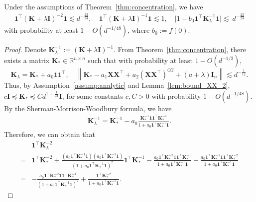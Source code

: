 \documentclass[twoside,11pt]{article}
\newcommand{\norm}[1]{\left\|#1\right\|}
\newcommand{\R}{\mathbb{R}}
\def\bI{{\mathbf I}}
\newcommand{\ones}{\mathbf{1}}
\def\bK{{\boldsymbol K}}
\def\bX{{\boldsymbol X}}
\renewcommand{\bK}{\boldsymbol{K}}
\newcommand{\1}{\mathbf{1}}
\def\tran{^\top}
\begin{document}
\begin{lemma}\label{lemm:oneK2one}
Under the assumptions of Theorem~\ref{thm:concentration}, we have
\begin{align}
    \ones^\top(\bK+\lambda\bI)^{-2}\ones\lesssim  d^{-\frac{23}{24}},  \quad 
     \1^\top(\bK+\lambda\bI)^{-1}\ones  \lesssim  1 , \quad 
          \big|1-  b_0\1^\top\bK_{\lambda}^{-1} \1\big|\lesssim ~ d^{-\frac{23}{24}}
\end{align}
 with probability at least $1-O(d^{-1/48})$, where $b_0:=f(0)$.
\end{lemma}
\begin{proof}
Denote $\bK_{\lambda}^{-1}:=(\bK+\lambda\bI)^{-1}$. From Theorem~\ref{thm:concentration}, there exists a matrix $\bK_*\in\R^{n\times n}$ such that with probability at least $1-O(d^{-1/2})$,
\[\bK_\lambda=\bK_*+a_0\1\1^\top, \quad \norm{\bK_*-a_1 \bX\bX\tran + a_2 (\bX\bX\tran)^{\odot 2} + (a+\lambda)\bI_n}\lesssim d^{-\frac{1}{12}}.\]
Thus, by Assumption~\ref{assump:analytic} and Lemma~\ref{lem:bound_XX_2},  $c\bI \preccurlyeq \bK_*\preccurlyeq Cd^{1+\frac{1}{24}}\bI$, for some constants $c,C>0$ with probability  $1-O(d^{-1/48})$. By the Sherman-Morrison-Woodbury formula, we have 
\begin{align}\label{eq:sm_formula}
    \bK_{\lambda}^{-1} = \bK_*^{-1}-a_0\frac{\bK_*^{-1}\1\1^\top\bK_*^{-1}}{1+a_0\1^\top\bK_*^{-1}\1}.
\end{align}
Therefore, we can obtain that
\begin{align}
    &\1^\top\bK_{\lambda}^{-2}  \\   =&\1^\top\bK_*^{-2}+\frac{(a_0\1^\top\bK_*^{-1}\1)(a_0\1^\top\bK_*^{-2}\1)}{(1+a_0\1^\top\bK_*^{-1}\1)^2}\1^\top\bK_*^{-1}-\frac{a_0\1^\top\bK_*^{-2}\1\1^\top\bK_*^{-1}}{1+a_0\1^\top\bK_*^{-1}\1}-\frac{a_0\1^\top\bK_*^{-1}\1\1^\top\bK_*^{-2}}{1+a_0\1^\top\bK_*^{-1}\1}\\
    =&-\frac{a_0\1^\top\bK_*^{-2}\1\1^\top\bK_*^{-1}}{(1+a_0\1^\top\bK_*^{-1}\1)^2}+\frac{\1^\top\bK_*^{-2}}{1+a_0\1^\top\bK_*^{-1}\1}.
\end{align}


\end{proof}
\end{document}
